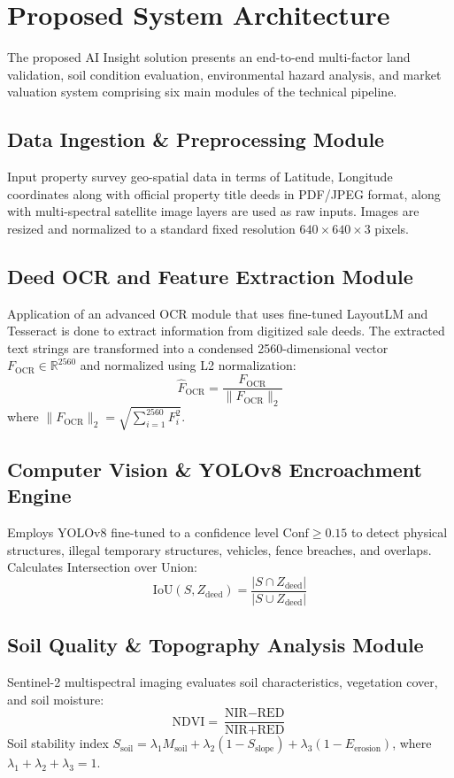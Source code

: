 \documentclass[conference]{IEEEtran}
\begin{document}
\section{Proposed System Architecture}
The proposed AI Insight solution presents an end-to-end multi-factor land validation, soil condition evaluation, environmental hazard analysis, and market valuation system comprising six main modules of the technical pipeline.

\subsection{Data Ingestion \& Preprocessing Module}
Input property survey geo-spatial data in terms of Latitude, Longitude coordinates along with official property title deeds in PDF/JPEG format, along with multi-spectral satellite image layers are used as raw inputs. Images are resized and normalized to a standard fixed resolution $640 \times 640 \times 3$ pixels.

\subsection{Deed OCR and Feature Extraction Module}
Application of an advanced OCR module that uses fine-tuned LayoutLM and Tesseract is done to extract information from digitized sale deeds. The extracted text strings are transformed into a condensed 2560-dimensional vector $F_{\text{OCR}} \in \mathbb{R}^{2560}$ and normalized using L2 normalization:
\begin{equation}
\hat{F}_{\text{OCR}} = \frac{F_{\text{OCR}}}{\|F_{\text{OCR}}\|_2}
\end{equation}
where $\|F_{\text{OCR}}\|_2 = \sqrt{\sum_{i=1}^{2560} F_i^2}$.

\subsection{Computer Vision \& YOLOv8 Encroachment Engine}
Employs YOLOv8 fine-tuned to a confidence level $\text{Conf} \ge 0.15$ to detect physical structures, illegal temporary structures, vehicles, fence breaches, and overlaps. Calculates Intersection over Union:
\begin{equation}
\text{IoU}(S, Z_{\text{deed}}) = \frac{|S \cap Z_{\text{deed}}|}{|S \cup Z_{\text{deed}}|}
\end{equation}

\subsection{Soil Quality \& Topography Analysis Module}
Sentinel-2 multispectral imaging evaluates soil characteristics, vegetation cover, and soil moisture:
\begin{equation}
\text{NDVI} = \frac{\text{NIR} - \text{RED}}{\text{NIR} + \text{RED}}
\end{equation}
Soil stability index $S_{\text{soil}} = \lambda_1 M_{\text{soil}} + \lambda_2 (1 - S_{\text{slope}}) + \lambda_3 (1 - E_{\text{erosion}})$, where $\lambda_1 + \lambda_2 + \lambda_3 = 1$.
\end{document}
